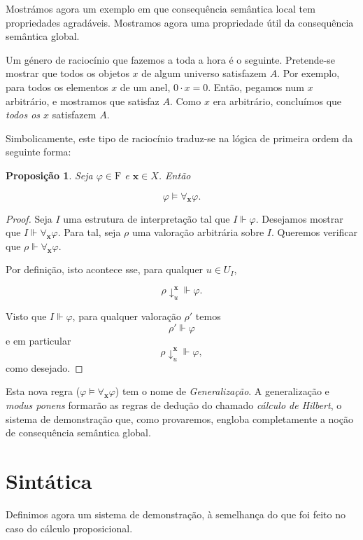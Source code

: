 \documentclass{report}
\newtheorem{prop}{Proposição}
\theoremstyle{definition}
\theoremstyle{remark}
\renewcommand{\bf}[1]{\mathbf{#1}}
\newcommand{\F}{\mathrm{F}}
\begin{document}
	\smallskip
	
	Mostrámos agora um exemplo em que consequência semântica local tem propriedades agradáveis. Mostramos agora uma propriedade útil da consequência semântica global.
	
	Um género de raciocínio que fazemos a toda a hora é o seguinte. Pretende-se mostrar que todos os objetos $x$ de algum universo satisfazem $A$. Por exemplo, para todos os elementos $x$ de um anel, $0 \cdot x = 0$. Então, pegamos num $x$ arbitrário, e mostramos que satisfaz $A$. Como $x$ era arbitrário, concluímos que \emph{todos os $x$} satisfazem $A$.
	
	Simbolicamente, este tipo de raciocínio traduz-se na lógica de primeira ordem da seguinte forma:
	
	\begin{prop}
	Seja $\varphi \in \F$ e $\bf x \in X$. Então
	
	\[\varphi \vDash \forall_{\bf x} \varphi.\]
	\end{prop}
	
	\begin{proof}
	Seja $I$ uma estrutura de interpretação tal que $I \Vdash \varphi$. Desejamos mostrar que $I \Vdash \forall_{\bf x} \varphi$. Para tal, seja $\rho$ uma valoração arbitrária sobre $I$. Queremos verificar que $\rho \Vdash \forall_{\bf x} \varphi$.
	
	Por definição, isto acontece sse, para qualquer $u \in U_I$,
	
	\[\rho\!\downarrow^{\bf x}_u \Vdash \varphi.\]
	
	Visto que $I \Vdash \varphi$, para qualquer valoração $\rho'$ temos
	\[\rho' \Vdash \varphi\]
	e em particular
	\[\rho\!\downarrow^{\bf x}_u \Vdash \varphi,\]
	como desejado.
	\end{proof}
	
	Esta nova regra ($\varphi \vDash \forall_{\bf x} \varphi$) tem o nome de \emph{Generalização}. A generalização e \textit{modus ponens} formarão as regras de dedução do chamado \emph{cálculo de Hilbert}, o sistema de demonstração que, como provaremos, engloba completamente a noção de consequência semântica global.
	
	\section{Sintática}
	
	Definimos agora um sistema de demonstração, à semelhança do que foi feito no caso do cálculo proposicional.
	
\end{document}
